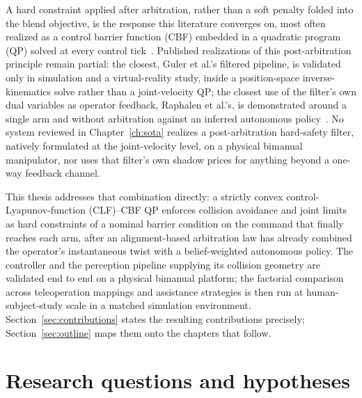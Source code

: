 \documentclass[12pt,a4paper,twoside,openright]{report}
\begin{document}
A hard constraint applied after arbitration, rather than a soft penalty folded into the blend objective, is the response this literature converges on, most often realized as a control barrier function (CBF) embedded in a quadratic program (QP) solved at every control tick~\cite{ames2017cbf}. Published realizations of this post-arbitration principle remain partial: the closest, Guler et al.'s filtered pipeline, is validated only in simulation and a virtual-reality study, inside a position-space inverse-kinematics solve rather than a joint-velocity QP; the closest use of the filter's own dual variables as operator feedback, Raphalen et al.'s, is demonstrated around a single arm and without arbitration against an inferred autonomous policy~\cite{raphalen2026feeling}. No system reviewed in Chapter~\ref{ch:sota} realizes a post-arbitration hard-safety filter, natively formulated at the joint-velocity level, on a physical bimanual manipulator, nor uses that filter's own shadow prices for anything beyond a one-way feedback channel.

This thesis addresses that combination directly: a strictly convex control-Lyapunov-function (CLF)--CBF QP enforces collision avoidance and joint limits as hard constraints of a nominal barrier condition on the command that finally reaches each arm, after an alignment-based arbitration law has already combined the operator's instantaneous twist with a belief-weighted autonomous policy. The controller and the perception pipeline supplying its collision geometry are validated end to end on a physical bimanual platform; the factorial comparison across teleoperation mappings and assistance strategies is then run at human-subject-study scale in a matched simulation environment. Section~\ref{sec:contributions} states the resulting contributions precisely; Section~\ref{sec:outline} maps them onto the chapters that follow.

\section{Research questions and hypotheses}
\label{sec:rqs}
\end{document}
